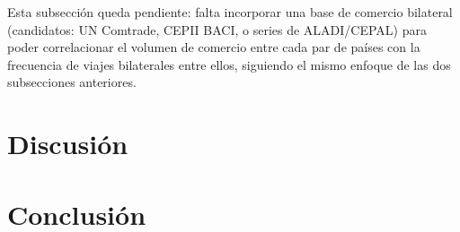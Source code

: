 \documentclass[11pt,a4paper]{article}
\begin{document}

Esta subsecci\'on queda pendiente: falta incorporar una base de comercio bilateral (candidatos: UN Comtrade, CEPII BACI, o series de ALADI/CEPAL) para poder correlacionar el volumen de comercio entre cada par de pa\'ises con la frecuencia de viajes bilaterales entre ellos, siguiendo el mismo enfoque de las dos subsecciones anteriores.

\section{Discusi\'on}

\section{Conclusi\'on}

\printbibliography
\end{document}
